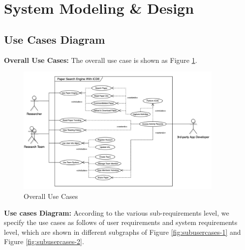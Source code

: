 \section{System Modeling \& Design}

\subsection{Use Cases Diagram}

\textbf{Overall Use Cases: }The overall use case is shown as Figure \ref{fig:oucs}.

\begin{figure}[!ht]
	\centering
	\includegraphics[width=0.9\textwidth]{./img/Figure_overall-use-cases.jpg}
	\caption{Overall Use Cases}
	\label{fig:oucs}
\end{figure}

\textbf{Use cases Diagram: }According to the various sub-requirements level,
we specify the use cases as follows of user requirements and system requirements level,
which are shown in different subgraphs of Figure \ref{fig:subusercases-1} and Figure \ref{fig:subusercases-2}.

